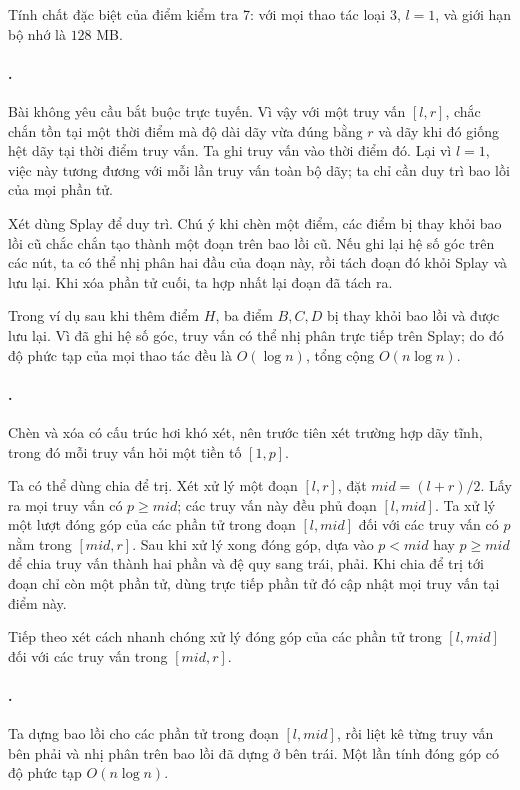 \documentclass[11pt]{article}
\begin{document}
Tính chất đặc biệt của điểm kiểm tra 7: với mọi thao tác loại \(3\), \(l=1\),
và giới hạn bộ nhớ là \(128\) MB.

\paragraph{.}
Bài không yêu cầu bắt buộc trực tuyến. Vì vậy với một truy vấn \([l,r]\), chắc
chắn tồn tại một thời điểm mà độ dài dãy vừa đúng bằng \(r\) và dãy khi đó
giống hệt dãy tại thời điểm truy vấn. Ta ghi truy vấn vào thời điểm đó. Lại vì
\(l=1\), việc này tương đương với mỗi lần truy vấn toàn bộ dãy; ta chỉ cần duy
trì bao lồi của mọi phần tử.

Xét dùng Splay để duy trì. Chú ý khi chèn một điểm, các điểm bị thay khỏi bao
lồi cũ chắc chắn tạo thành một đoạn trên bao lồi cũ. Nếu ghi lại hệ số góc
trên các nút, ta có thể nhị phân hai đầu của đoạn này, rồi tách đoạn đó khỏi
Splay và lưu lại. Khi xóa phần tử cuối, ta hợp nhất lại đoạn đã tách ra.

Trong ví dụ sau khi thêm điểm \(H\), ba điểm \(B,C,D\) bị thay khỏi bao lồi
và được lưu lại. Vì đã ghi hệ số góc, truy vấn có thể nhị
phân trực tiếp trên Splay; do đó độ phức tạp của mọi thao tác đều là
\(O(\log n)\), tổng cộng \(O(n\log n)\).

\paragraph{.}
Chèn và xóa có cấu trúc hơi khó xét, nên trước tiên xét trường hợp dãy tĩnh,
trong đó mỗi truy vấn hỏi một tiền tố \([1,p]\).

Ta có thể dùng chia để trị. Xét xử lý một đoạn \([l,r]\), đặt
\(\mathit{mid}=(l+r)/2\). Lấy ra mọi truy vấn có \(p\ge \mathit{mid}\); các
truy vấn này đều phủ đoạn \([l,\mathit{mid}]\). Ta xử lý một lượt đóng góp của
các phần tử trong đoạn \([l,\mathit{mid}]\) đối với các truy vấn có \(p\) nằm
trong \([\mathit{mid},r]\). Sau khi xử lý xong đóng góp, dựa vào
\(p<\mathit{mid}\) hay \(p\ge \mathit{mid}\) để chia truy vấn thành hai phần
và đệ quy sang trái, phải. Khi chia để trị tới đoạn chỉ còn một phần tử, dùng
trực tiếp phần tử đó cập nhật mọi truy vấn tại điểm này.

Tiếp theo xét cách nhanh chóng xử lý đóng góp của các phần tử trong
\([l,\mathit{mid}]\) đối với các truy vấn trong \([\mathit{mid},r]\).

\paragraph{.}
Ta dựng bao lồi cho các phần tử trong đoạn \([l,\mathit{mid}]\), rồi liệt kê
từng truy vấn bên phải và nhị phân trên bao lồi đã dựng ở bên trái. Một lần
tính đóng góp có độ phức tạp \(O(n\log n)\).
\end{document}
